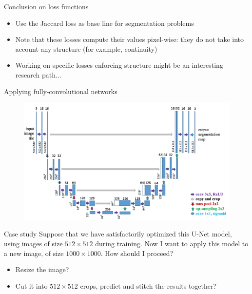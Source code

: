 \documentclass[xcolor=pdftex,dvipsnames,table,mathserif]{beamer}
\begin{document}
\begin{frame}{Conclusion on loss functions}

  \begin{itemize}
  \item Use the Jaccard loss as base line for segmentation problems
  \item Note that these losses compute their values pixel-wise: they do not take into account any structure (for example, continuity)
  \item Working on specific losses enforcing structure might be an interesting research path...
  \end{itemize}
\end{frame}


\begin{frame}{Applying fully-convolutional networks}

\begin{figure}[ht]
  \centering
  \includegraphics[height=0.35\textheight]{unet_lo}
\end{figure}


\begin{block}{Case study}
Suppose that we have satisfactorily optimized this U-Net model, using images of size $512 \times 512$ during training. Now I want to apply this model to a new image, of size $1000 \times 1000$. How should I proceed?
\end{block}

\begin{itemize}
\item Resize the image?
\item Cut it into $512 \times 512$ crops, predict and stitch the results together?
\end{itemize}

\end{frame}
\end{document}
